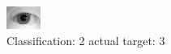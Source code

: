 \begin{figure}[h!]
\begin{center}
\includegraphics[width=0.60\columnwidth]{figures/ID1193_class_2_target_3.png}
\end{center}
\caption{ Classification: 2 actual target: 3}
\label{fig:ID1193_class_2_target_3}
\end{figure}
